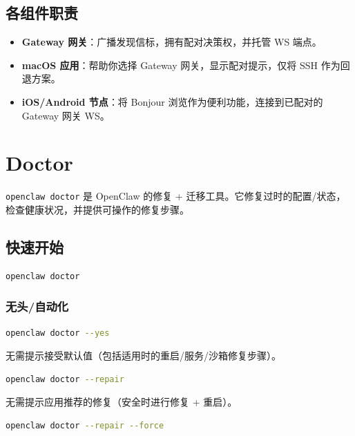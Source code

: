 \subsection{各组件职责}


\begin{itemize}
  \item \textbf{Gateway 网关}：广播发现信标，拥有配对决策权，并托管 WS 端点。
  \item \textbf{macOS 应用}：帮助你选择 Gateway 网关，显示配对提示，仅将 SSH 作为回退方案。
  \item \textbf{iOS/Android 节点}：将 Bonjour 浏览作为便利功能，连接到已配对的 Gateway 网关 WS。
\end{itemize}



\clearpage

\section{Doctor}


\texttt{openclaw doctor} 是 OpenClaw 的修复 + 迁移工具。它修复过时的配置/状态，检查健康状况，并提供可操作的修复步骤。

\subsection{快速开始}


\begin{lstlisting}[language=bash]
openclaw doctor
\end{lstlisting}


\subsubsection{无头/自动化}


\begin{lstlisting}[language=bash]
openclaw doctor --yes
\end{lstlisting}


无需提示接受默认值（包括适用时的重启/服务/沙箱修复步骤）。

\begin{lstlisting}[language=bash]
openclaw doctor --repair
\end{lstlisting}


无需提示应用推荐的修复（安全时进行修复 + 重启）。

\begin{lstlisting}[language=bash]
openclaw doctor --repair --force
\end{lstlisting}


